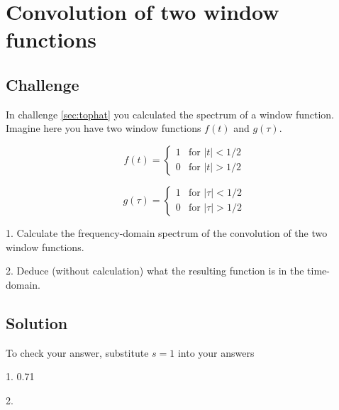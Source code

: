 \newpage
\section{Convolution of two window functions}

\subsection*{Challenge}

In challenge \ref{sec:tophat} you calculated the spectrum of a window function. Imagine here you have two window functions $f(t)$ and $g(\tau)$.

\begin{equation}
    f(t)=
    \begin{cases}
        1 & \text{for } |t| < 1/2 \\
        0 & \text{for } |t| > 1/2
    \end{cases}
\end{equation}

\begin{equation}
    g(\tau)=
    \begin{cases}
        1 & \text{for } |\tau| < 1/2 \\
        0 & \text{for } |\tau| > 1/2
    \end{cases}
\end{equation}

1. Calculate the frequency-domain spectrum of the convolution of the two window functions.

2. Deduce (without calculation) what the resulting function is in the time-domain.

\subsection*{Solution}
To check your answer, substitute $s=1$ into your answers

1. 0.71

2. 

\timebox
\fi
